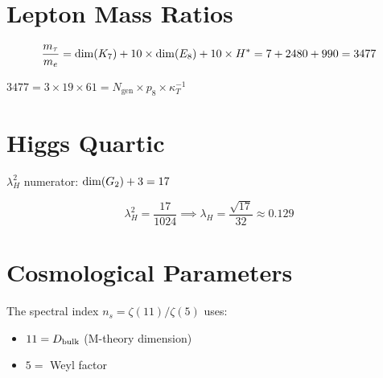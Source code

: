 \section{Lepton Mass Ratios}

\begin{theorem}\label{thm:m_tau_m_e}
    \leanok
    \[
        \frac{m_\tau}{m_e} = \mathrm{dim}(K_7) + 10 \times \mathrm{dim}(E_8) + 10 \times H^*
        = 7 + 2480 + 990 = 3477
    \]
\end{theorem}

\begin{theorem}\label{thm:m_tau_m_e_factorization}
    \leanok
    $3477 = 3 \times 19 \times 61 = N_{\mathrm{gen}} \times p_8 \times \kappa_T^{-1}$
\end{theorem}

\section{Higgs Quartic}

\begin{definition}\label{def:lambda_H_num}
    \leanok
    $\lambda_H^2$ numerator: $\mathrm{dim}(G_2) + 3 = 17$
\end{definition}

\begin{theorem}\label{thm:lambda_H}
    \leanok
    \[
        \lambda_H^2 = \frac{17}{1024} \implies \lambda_H = \frac{\sqrt{17}}{32} \approx 0.129
    \]
\end{theorem}

\section{Cosmological Parameters}

\begin{theorem}\label{thm:n_s_indices}
    \leanok
    The spectral index $n_s = \zeta(11)/\zeta(5)$ uses:
    \begin{itemize}
        \item $11 = D_{\mathrm{bulk}}$ (M-theory dimension)
        \item $5 = $ Weyl factor
    \end{itemize}
\end{theorem}


